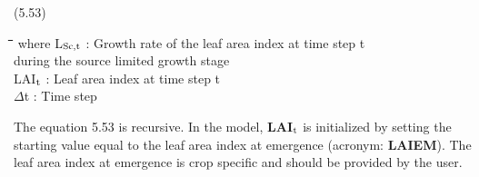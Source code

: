 \documentclass[11pt]{article}
\begin{document}
 \bigskip
\strut\hfill (5.53)
\nwln
\begin{tabbing}
\hspace{1.27cm}\=\hspace{1.27cm}\=\hspace{1.27cm}\=\hspace{1.27cm}\=%
\hspace{1.27cm}\=\hspace{1.27cm}\=\hspace{1.27cm}\=\hspace{1.27cm}\=%
\hspace{1.27cm}\=\hspace{1.27cm}\=\kill
where\> L$_{{\rm Sc,t}}$\> : Growth rate of the leaf area index at time step t\\
\>\>   during the source limited growth stage\> \> \> \> \> \> \> \> [ha ha$^{{\rm -1}}$ d$^{{\rm -1}}$]\\
\>LAI$_{{\rm t}}$\> : Leaf area index at time step t\> \> \> \> \> \>  \> \> [ha ha$^{{\rm -1}}$]\\
\>$\Delta$t\> : Time step\> \> \> \> \> \> \> \> [d]
\end{tabbing}

 \bigskip
The equation 5.53 is recursive. In the model, {\bf LAI$_{{\rm t}}$} is initialized by setting the starting
value equal to the leaf area index at emergence (acronym: {\bf LAIEM}). The leaf area index
at emergence is crop specific and should be provided by the user.
\end{document}
